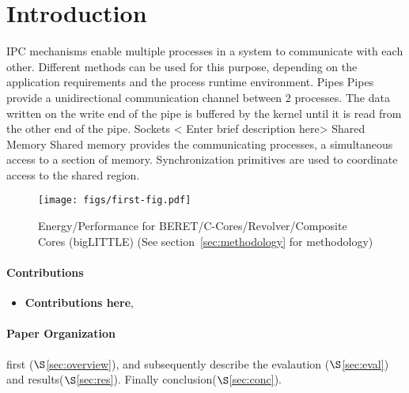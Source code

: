 \section{Introduction}\label{sec:intro}


IPC mechanisms enable multiple processes in a system to communicate with each other. Different methods can be used for this purpose, depending on the application requirements and the process runtime environment. 
Pipes
Pipes provide a unidirectional communication channel between 2 processes. The data written on the write end of the pipe is buffered by the kernel until it is read from the other end of the pipe.
Sockets
< Enter brief description here>
Shared Memory
Shared memory provides the communicating processes, a simultaneous access to a section of memory. Synchronization primitives are used to coordinate access to the shared region. 

\begin{figure}
  \texttt{[image: figs/first-fig.pdf]}
  \caption{Energy/Performance for BERET/C-Cores/Revolver/Composite Cores (bigLITTLE) \newline 
           \textnormal{\small (See section~\ref{sec:methodology} for methodology)} }
  \label{fig:existing}
\end{figure}
\fi


\paragraph{Contributions}
\begin{itemize}
\item \textbf {Contributions here},
\end{itemize}

\paragraph{Paper Organization}
first ($\S$\ref{sec:overview}), and subsequently describe the
evalaution ($\S$\ref{sec:eval}) and results($\S$\ref{sec:res}).
Finally conclusion($\S$\ref{sec:conc}).


